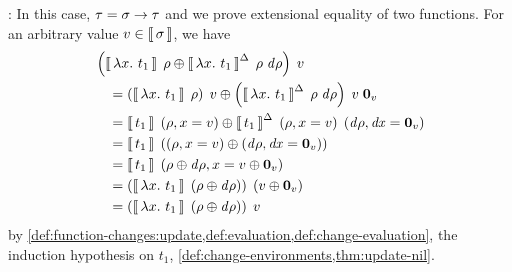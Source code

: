 \begin{optionalproof}
  \Case {}: In this case, $\Gt = \Fun{\Gs}{\Gt}$
  and we prove extensional equality of two functions. For an
  arbitrary value $v \in \Eval{\Gs}$, we have
  \begin{align*}
    &         \App
                {\Apply*
                  {\EvalIncWith{\Lam{x}{t_1}}{\Gr}{\D \Gr}}
                  {\EvalWith{\Lam{x}{t_1}}{\Gr}}}
                {v}\\
    & \quad = \Apply
                {\App
                  {\App
                    {\EvalIncWith*{\Lam{x}{t_1}}{\Gr}{\D \Gr}}
                    {v}}
                  {\Nil[\Gt _1]{v}}}
                {\App
                  {\EvalWith*{\Lam{x}{t_1}}{\Gr}}
                  {v}}\\
    & \quad = \Apply
                {\EvalIncWith
                  {t_1}
                  {\ExtendEnv*[\Gr]{x}{v}}
                  {\ExtendEnv*[\D \Gr]{\D x}{\Nil{v}}}}
                {\EvalWith
                  {t_1}
                  {\ExtendEnv*[\Gr]{x}{v}}}\\
    & \quad = \EvalWith
                {t_1}
                {\Apply*
                  {\ExtendEnv*[\D \Gr]{\D x}{\Nil{v}}}
                  {\ExtendEnv*[\Gr]{x}{v}}}\\
    & \quad = \EvalWith
                {t_1}
                {\ExtendEnv*
                  [\Apply{\D \Gr}{\Gr}]
                  {x}
                  {\Apply{\Nil{v}}{v}}}\\
    & \quad = \App
                {\EvalWith*
                  {\Lam{x}{t_1}}
                  {\Apply*{\D \Gr}{\Gr}}}
                {\Apply*{\Nil{v}}{v}}\\
    & \quad = \App
                {\EvalWith*
                  {\Lam{x}{t_1}}
                  {\Apply*{\D \Gr}{\Gr}}}
                {v}
  \end{align*}
  by
  \cref{def:function-changes:update,def:evaluation,def:change-evaluation},
  the induction hypothesis on $t_1$,
  \cref{def:change-environments,thm:update-nil}.


\end{optionalproof}
